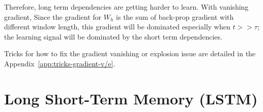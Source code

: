 \documentclass[11pt]{article}
\begin{document}
\begin{figure}[H]
    \centering
\end{figure}

Therefore, long term dependencies are getting harder to learn. With vanishing gradient, Since the gradient for $W_h$ is the sum of back-prop gradient with different window length, this gradient will be dominated especially when $t >> \tau$; the learning signal will be dominated by the short term dependencies.

\begin{figure}[H]
    \centering
\end{figure}

Tricks for how to fix the gradient vanishing or explosion issue are detailed in the Appendix~\ref{app:tricks-gradient-v/e}.

\section{Long Short-Term Memory (LSTM)}
\end{document}
